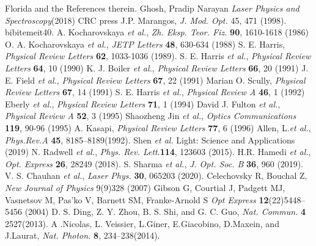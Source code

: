 \begin{thebibliography}{21}
Florida and the References therein.
 Ghosh, Pradip Narayan \textit{Laser Physics and Spectroscopy}(2018) CRC press
J.P. Marangos, \textit{J. Mod. Opt.} 45, 471 (1998).
bibitem{eit4}0. A. Kocharovskaya \textit{et al.}, \textit{Zh. Eksp. Teor. Fiz.} \textbf{90}, 1610-1618 (1986)
O. A. Kocharovskaya \textit{et al.}, \textit{JETP Letters} \textbf{48}, 630-634 (1988)
S. E. Harris, \textit{Physical Review Letters} \textbf{62}, 1033-1036 (1989).
S. E. Harris \textit{et al.}, \textit{Physical Review Letters} \textbf{64}, 10 (1990)
K. J. Boiler \textit{et al.}, \textit{Physical Review Letters} \textbf{66}, 20 (1991)
J. E. Field \textit{et al.}, \textit{Physical Review Letters} \textbf{67}, 22 (1991)
Marian O. Scully, \textit{Physical Review Letters} \textbf{67}, 14 (1991)
S. E. Harris \textit{et al.}, \textit{Physical Review A} \textbf{46}, 1 (1992)
Eberly \textit{et al.}, \textit{Physical Review Letters} \textbf{71}, 1 (1994)
David J. Fulton \textit{et al.}, \textit{Physical Review A} \textbf{52}, 3 (1995)
Shaozheng Jin \textit{et al.}, \textit{Optics Communications} \textbf{119}, 90-96 (1995)
A. Kasapi, \textit{Physical Review Letters} \textbf{77}, 6 (1996)
Allen, L.\textit{et al.}, \textit{Phys.Rev.A} \textbf{45}, 8185–8189(1992).
Shen \textit{et al.} Light: Science and Applications (2019)
N. Radwell \textit{et al.}, \textit{Phys. Rev. Lett}.\textbf{114}, 123603 (2015).
H.R. Hamedi \textit{et al.}, \textit{Opt. Express} \textbf{26}, 28249 (2018).
S. Sharma \textit{et al.}, \textit{J. Opt. Soc. B} \textbf{36}, 960 (2019).
V. S. Chauhan \textit{et al.}, \textit{ Laser Phys.} \textbf{30}, 065203 (2020).
Celechovsky R, Bouchal Z, \textit{ New Journal of Physics} 9(9)328 (2007)
Gibson G, Courtial J, Padgett MJ, Vasnetsov M, Pas’ko V, Barnett SM, Franke-Arnold S \textit{ Opt Express} \textbf{12}(22)5448–5456 (2004)
D. S. Ding, Z. Y. Zhou, B. S. Shi, and G. C. Guo, \textit{Nat. Commun.} \textbf{4} 2527(2013).
A .Nicolas, L. Veissier, L.Giner, E.Giacobino, D.Maxein, and J.Laurat, \textit{Nat. Photon.} \textbf{8}, 234–238(2014).

\fi




\end{thebibliography}
